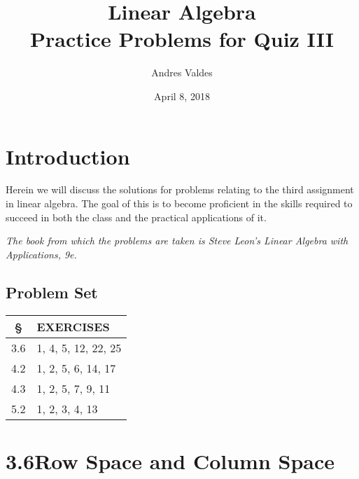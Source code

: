 \documentclass[12pt, letterpaper]{article}
\title{Linear Algebra \\
        \large Practice Problems for Quiz III}
\author{Andres Valdes}
\date{April 8, 2018}
\theoremstyle{remark}
\theoremstyle{remark}
\begin{document}
\begin{titlepage}

	\maketitle
	\thispagestyle{empty}

\end{titlepage}

\section*{Introduction}

Herein we will discuss the solutions for problems
relating to the third assignment in linear algebra. The
goal of this is to become proficient in the skills required
to succeed in both the class and the practical applications
of it.

\bigskip
\noindent
\textit{\small *The book from which the problems are taken is
	Steve Leon's Linear Algebra with Applications, 9e.}

\begin{center}

	\section*{Problem Set}

	\begin{tabular}{|c|l|}

		\hline
		§   & \textbf{EXERCISES}  \\
		\hline\hline
		3.6 & 1, 4, 5, 12, 22, 25 \\
		\hline
		4.2 & 1, 2, 5, 6, 14, 17  \\
		\hline
		4.3 & 1, 2, 5, 7, 9, 11   \\
		\hline
		5.2 & 1, 2, 3, 4, 13      \\
		\hline
	\end{tabular}

\end{center}

\pagebreak

\section*{3.6\quad{}Row Space and Column Space}
\end{document}

